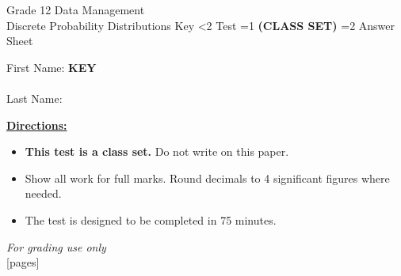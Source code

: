\documentclass[addpoints]{exam}
\newcommand{\event}{Discrete Probability Distributions}
\newcommand{\tournament}{}
\def\type{0}
\begin{document}
\begin{center}
    {\huge Grade 12 Data Management \\ \event
    \ifprintanswers \space Key
    \else \space \ifnum\type<2 Test \fi \ifnum\type=1 \textbf{(CLASS SET)} \fi
          \ifnum\type=2 Answer Sheet \fi
    \fi \\ \vspace{3mm}\tournament\vspace{1mm}}
\end{center}

\vspace{.25\textheight}

\begin{center}
    First Name: \ifprintanswers
    \underline{\hspace{3.5cm}}\textbf{KEY}\underline{\hspace{5.5cm}}\\\vspace{5mm}
    \else \underline{\hspace{10cm}}\\ \vspace{5mm} \fi
    Last Name: \underline{\hspace{10cm}}\\ \vspace{5mm}
\end{center}

\noindent\textbf{\underline{Directions:}}
\begin{itemize}
    \ifnum\type=1 \item \textbf{This test is a class set.} Do not write on this paper. \fi
    \item Show all work for full marks. Round decimals to 4 significant figures where needed.
    \item The test is designed to be completed in 75 minutes.
\end{itemize}
\begin{center}
\textit{For grading use only}\\
[pages]
\end{center}
\end{document}
